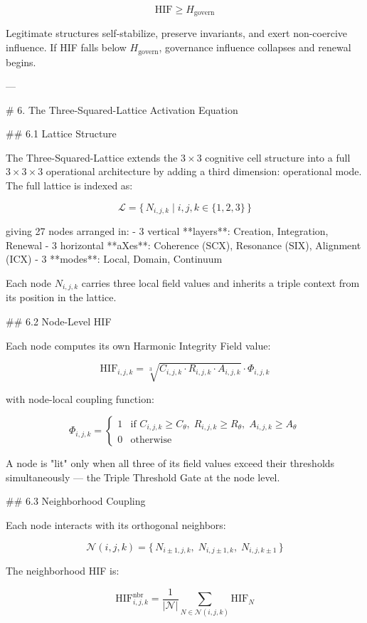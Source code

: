 \[
\mathrm{HIF} \ge H_{\text{govern}}
\]

Legitimate structures self-stabilize, preserve invariants, and exert non-coercive
influence. If HIF falls below \(H_{\text{govern}}\), governance influence collapses
and renewal begins.

---

# 6. The Three-Squared-Lattice Activation Equation

## 6.1 Lattice Structure

The Three-Squared-Lattice extends the \(3 \times 3\) cognitive cell structure into
a full \(3 \times 3 \times 3\) operational architecture by adding a third
dimension: operational mode. The full lattice is indexed as:

\[
\mathcal{L} = \{\, N_{i,j,k} \mid i,j,k \in \{1,2,3\} \,\}
\]

giving 27 nodes arranged in:
- 3 vertical **layers**: Creation, Integration, Renewal
- 3 horizontal **aXes**: Coherence (SCX), Resonance (SIX), Alignment (ICX)
- 3 **modes**: Local, Domain, Continuum

Each node \(N_{i,j,k}\) carries three local field values and inherits a triple
context from its position in the lattice.

## 6.2 Node-Level HIF

Each node computes its own Harmonic Integrity Field value:

\[
\mathrm{HIF}_{i,j,k} = \sqrt[3]{C_{i,j,k} \cdot R_{i,j,k} \cdot A_{i,j,k}}
\cdot \Phi_{i,j,k}
\]

with node-local coupling function:

\[
\Phi_{i,j,k} =
\begin{cases}
1 & \text{if } C_{i,j,k} \ge C_{\theta},\; R_{i,j,k} \ge R_{\theta},\;
A_{i,j,k} \ge A_{\theta} \\
0 & \text{otherwise}
\end{cases}
\]

A node is "lit" only when all three of its field values exceed their thresholds
simultaneously — the Triple Threshold Gate at the node level.

## 6.3 Neighborhood Coupling

Each node interacts with its orthogonal neighbors:

\[
\mathcal{N}(i,j,k) = \{\, N_{i\pm1,j,k},\; N_{i,j\pm1,k},\; N_{i,j,k\pm1} \,\}
\]

The neighborhood HIF is:

\[
\mathrm{HIF}^{\text{nbr}}_{i,j,k} = \frac{1}{|\mathcal{N}|} \sum_{N \in
\mathcal{N}(i,j,k)} \mathrm{HIF}_N
\]

